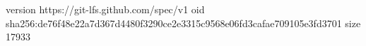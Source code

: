 version https://git-lfs.github.com/spec/v1
oid sha256:de76f48e22a7d367d4480f3290ce2e3315c9568e06fd3cafae709105e3fd3701
size 17933
